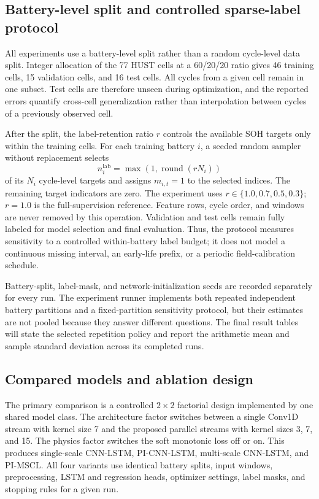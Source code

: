 \documentclass[a4paper,fleqn]{cas-dc}
\begin{document}
\subsection{Battery-level split and controlled sparse-label protocol}
\label{subsec:split_protocol}

All experiments use a battery-level split rather than a random cycle-level data split. Integer allocation of the 77 HUST cells at a 60/20/20 ratio gives 46 training cells, 15 validation cells, and 16 test cells. All cycles from a given cell remain in one subset. Test cells are therefore unseen during optimization, and the reported errors quantify cross-cell generalization rather than interpolation between cycles of a previously observed cell.

After the split, the label-retention ratio $r$ controls the available SOH targets only within the training cells. For each training battery $i$, a seeded random sampler without replacement selects
\begin{equation}
  n_i^{\mathrm{lab}}=\max\left(1,\operatorname{round}(rN_i)\right)
\end{equation}
of its $N_i$ cycle-level targets and assigns $m_{i,t}=1$ to the selected indices. The remaining target indicators are zero. The experiment uses $r\in\{1.0,0.7,0.5,0.3\}$; $r=1.0$ is the full-supervision reference. Feature rows, cycle order, and windows are never removed by this operation. Validation and test cells remain fully labeled for model selection and final evaluation. Thus, the protocol measures sensitivity to a controlled within-battery label budget; it does not model a continuous missing interval, an early-life prefix, or a periodic field-calibration schedule.

Battery-split, label-mask, and network-initialization seeds are recorded separately for every run. The experiment runner implements both repeated independent battery partitions and a fixed-partition sensitivity protocol, but their estimates are not pooled because they answer different questions. The final result tables will state the selected repetition policy and report the arithmetic mean and sample standard deviation across its completed runs.

\subsection{Compared models and ablation design}
\label{subsec:baselines}

The primary comparison is a controlled $2\times2$ factorial design implemented by one shared model class. The architecture factor switches between a single Conv1D stream with kernel size 7 and the proposed parallel streams with kernel sizes 3, 7, and 15. The physics factor switches the soft monotonic loss off or on. This produces single-scale CNN-LSTM, PI-CNN-LSTM, multi-scale CNN-LSTM, and PI-MSCL. All four variants use identical battery splits, input windows, preprocessing, LSTM and regression heads, optimizer settings, label masks, and stopping rules for a given run.
\end{document}
